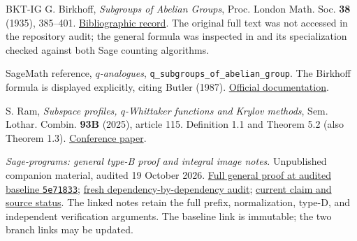 \documentclass[11pt,letterpaper]{article}
\begin{document}
{\begin{thebibliography}{BKT-IG}
G. Birkhoff, \emph{Subgroups of Abelian Groups},
Proc. London Math. Soc. \textbf{38} (1935), 385--401.
\href{https://doi.org/10.1112/plms/s2-38.1.385}{Bibliographic record}.
The original full text was not accessed in the repository audit; the
general formula was inspected in \cite{Sage} and its specialization
checked against both Sage counting algorithms.

SageMath reference, \emph{\(q\)-analogues},
\texttt{q\_subgroups\_of\_abelian\_group}.
The Birkhoff formula is displayed explicitly, citing Butler (1987).
\href{https://doc.sagemath.org/html/en/reference/combinat/sage/combinat/q_analogues.html}{Official documentation}.

S. Ram, \emph{Subspace profiles, \(q\)-Whittaker functions and Krylov methods},
Sem. Lothar. Combin. \textbf{93B} (2025), article 115.
Definition 1.1 and Theorem 5.2 (also Theorem 1.3).
\href{https://www.mat.univie.ac.at/~slc/wpapers/FPSAC2025/115.pdf}{Conference paper}.

\emph{Sage-programs: general type-B proof and integral image notes}.
Unpublished companion material, audited 19 October 2026.
\href{https://github.com/sean-rogers-t/Sage-programs/blob/5e718334a0f8ed9b31166aa3bf42185a60d05c34/borel/TYPE_B_GENERAL_SMITH.md}{Full general proof at audited baseline \texttt{5e71833}};
\href{https://github.com/sean-rogers-t/Sage-programs/blob/codex/borel-library/borel/TYPE_B_GENERAL_AUDIT.md}{fresh dependency-by-dependency audit};
\href{https://github.com/sean-rogers-t/Sage-programs/blob/codex/borel-library/borel/PROOF_STATUS.md}{current claim and source status}.
The linked notes retain the full prefix, normalization, type-D, and
independent verification arguments. The baseline link is immutable;
the two branch links may be updated.
\end{thebibliography}
}
\end{document}

